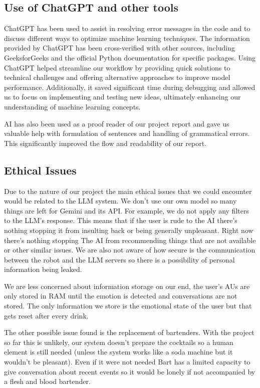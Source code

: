 \documentclass[conference]{IEEEtran}
\begin{document}
\subsection{Use of ChatGPT and other tools}

ChatGPT has been used to assist in resolving error messages in the code and to discuss different ways to optimize machine learning techniques. The information provided by ChatGPT has been cross-verified with other sources, including GeeksforGeeks and the official Python documentation for specific packages. Using ChatGPT helped streamline our workflow by providing quick solutions to technical challenges and offering alternative approaches to improve model performance. Additionally, it saved significant time during debugging and allowed us to focus on implementing and testing new ideas, ultimately enhancing our understanding of machine learning concepts.

AI has also been used as a proof reader of our project report and gave us valuable help with formulation of sentences and handling of grammatical errors. This significantly improved the flow and readability of our report. 

\subsection{Ethical Issues}
Due to the nature of our project the main ethical issues that we could encounter would be related to the LLM system.
We don't use our own model so many things are left for Gemini and its API. For example, we do not apply any filters to the LLM's response.
This means that if the user is rude to the AI there's nothing stopping it from insulting back or being generally unpleasant. Right now there's nothing stopping
The AI from recommending things that are not available or other similar issues. We are also not aware of how secure is the communication between the robot
and the LLM servers so there is a possibility of personal information being leaked.

We are less concerned about information storage on our end, the user's AUs are only stored in RAM until the emotion is detected and conversations are not stored.
The only information we store is the emotional state of the user but that gets reset after every drink.

The other possible issue found is the replacement of bartenders. With the project so far this is unlikely,
our system doesn't prepare the cocktails so a human element is still needed (unless the system works like a soda machine but
it wouldn't be pleasant). Even if it were not needed Bart has a limited capacity to give conversation about recent events so it would be lonely if not accompanied by a flesh and blood bartender.
\end{document}
